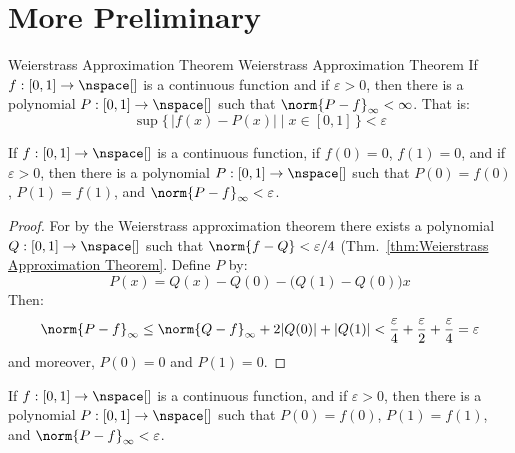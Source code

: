 \documentclass{article}                                                        %
\begin{document}
    \section{More Preliminary}
        \begin{ftheorem}{Weierstrass Approximation Theorem}
                        {Weierstrass Approximation Theorem}
            If $f:[0,1]\rightarrow\nspace[]$ is a continuous function and if
            $\varepsilon>0$, then there is a polynomial
            $P:[0,1]\rightarrow\nspace[]$ such that
            $\norm{P-f}_{\infty}<\infty$. That is:
            \begin{equation*}
                \sup\big\{\,|f(x)-P(x)|\;\big|\;x\in[0,1]\,\big\}<\varepsilon
            \end{equation*}
        \end{ftheorem}
        \begin{theorem}
            \label{thm:Weierstrass_Approx_Endpoints_Eq_Zero}%
            If $f:[0,1]\rightarrow\nspace[]$ is a continuous function, if
            $f(0)=0$, $f(1)=0$, and if $\varepsilon>0$, then there is a
            polynomial $P:[0,1]\rightarrow\nspace[]$ such that $P(0)=f(0)$,
            $P(1)=f(1)$, and $\norm{P-f}_{\infty}<\varepsilon$.
        \end{theorem}
        \begin{proof}
            For by the Weierstrass approximation theorem there exists a
            polynomial $Q:[0,1]\rightarrow\nspace[]$ such that
            $\norm{f-Q}<\varepsilon/4$
            (Thm.~\ref{thm:Weierstrass Approximation Theorem}. Define $P$ by:
            \begin{equation}
                P(x)=Q(x)-Q(0)-\big(Q(1)-Q(0)\big)x
            \end{equation}
            Then:
            \begin{equation}
                \norm{P-f}_{\infty}\leq
                \norm{Q-f}_{\infty}+2|Q(0)|+|Q(1)|
                <\frac{\varepsilon}{4}+\frac{\varepsilon}{2}
                    +\frac{\varepsilon}{4}=\varepsilon
            \end{equation}
            and moreover, $P(0)=0$ and $P(1)=0$.
        \end{proof}
        \begin{theorem}
            \label{thm:Weierstrass_Fixed_Endpoints}%
            If $f:[0,1]\rightarrow\nspace[]$ is a continuous function, and if
            $\varepsilon>0$, then there is a polynomial
            $P:[0,1]\rightarrow\nspace[]$ such that $P(0)=f(0)$, $P(1)=f(1)$,
            and $\norm{P-f}_{\infty}<\varepsilon$.
        \end{theorem}
\end{document}
